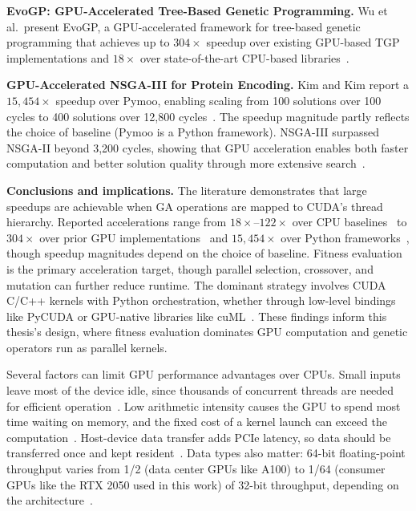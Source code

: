 \textbf{EvoGP: GPU-Accelerated Tree-Based Genetic Programming.} Wu et al.\ present EvoGP, a GPU-accelerated framework for tree-based genetic programming that achieves up to $304\times$ speedup over existing GPU-based TGP implementations and $18\times$ over state-of-the-art CPU-based libraries~\cite{wu2025evogp}.

\textbf{GPU-Accelerated NSGA-III for Protein Encoding.} Kim and Kim report a $15{,}454\times$ speedup over Pymoo, enabling scaling from 100 solutions over 100 cycles to 400 solutions over 12,800 cycles~\cite{kim2024gpu}. The speedup magnitude partly reflects the choice of baseline (Pymoo is a Python framework). NSGA-III surpassed NSGA-II beyond 3,200 cycles, showing that GPU acceleration enables both faster computation and better solution quality through more extensive search~\cite{kim2024gpu}.

\textbf{Conclusions and implications.} The literature demonstrates that large speedups are achievable when GA operations are mapped to CUDA's thread hierarchy. Reported accelerations range from $18\times$--$122\times$ over CPU baselines~\cite{wu2025evogp,rangavajhala2024accelerating,sathia2021accelerating} to $304\times$ over prior GPU implementations~\cite{wu2025evogp} and $15{,}454\times$ over Python frameworks~\cite{kim2024gpu}, though speedup magnitudes depend on the choice of baseline. Fitness evaluation is the primary acceleration target, though parallel selection, crossover, and mutation can further reduce runtime. The dominant strategy involves CUDA C/C++ kernels with Python orchestration, whether through low-level bindings like PyCUDA or GPU-native libraries like cuML~\cite{sathia2021accelerating}. These findings inform this thesis's design, where fitness evaluation dominates GPU computation and genetic operators run as parallel kernels.




Several factors can limit GPU performance advantages over CPUs. Small inputs leave most of the device idle, since thousands of concurrent threads are needed for efficient operation~\cite{carpentries_gpu}. Low arithmetic intensity causes the GPU to spend most time waiting on memory, and the fixed cost of a kernel launch can exceed the computation~\cite{carpentries_gpu}. Host-device data transfer adds PCIe latency, so data should be transferred once and kept resident~\cite{carpentries_gpu}. Data types also matter: 64-bit floating-point throughput varies from 1/2 (data center GPUs like A100) to 1/64 (consumer GPUs like the RTX 2050 used in this work) of 32-bit throughput, depending on the architecture~\cite{nvidia2024programming}.

